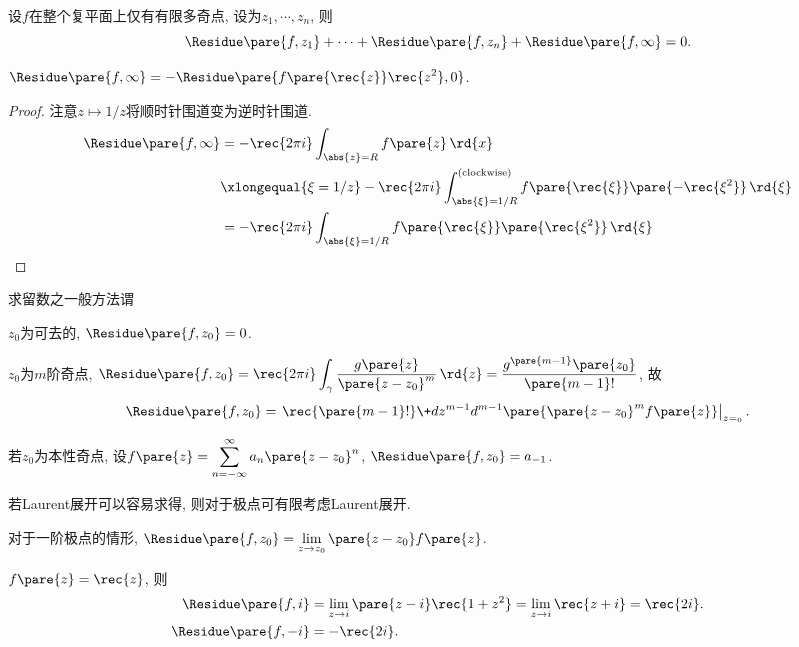 \documentclass[../ComplexVariable.tex]{subfiles}
\begin{document}
\begin{theorem}
    设$f$在整个复平面上仅有有限多奇点, 设为$z_1, \cdots, z_n$, 则
    \[ \Residue\pare{f,z_1} + \cdots + \Residue\pare{f,z_n} + \Residue\pare{f,\infty} = 0. \]
\end{theorem}
\begin{theorem}
    $\displaystyle \Residue\pare{f,\infty} = -\Residue\pare{f\pare{\rec{z}}\rec{z^2}, 0}$.
\end{theorem}
\begin{proof}
    注意$z\mapsto 1/z$将顺时针围道变为逆时针围道.
    \begin{align*}
        \Residue\pare{f,\infty} &= -\rec{2\pi i} \int_{\abs{z}=R}f\pare{z}\,\rd{x} \\ &\xlongequal{\xi = 1/z} -\rec{2\pi i} \int^{\mathrm{(clockwise)}}_{\abs{\xi} = 1/R} f\pare{\rec{\xi}} \pare{-\rec{\xi^2}}\,\rd{\xi} \\
        &= -\rec{2\pi i} \int_{\abs{\xi} = 1/R} f\pare{\rec{\xi}} \pare{\rec{\xi^2}}\,\rd{\xi} \qedhere
    \end{align*}
\end{proof}
求留数之一般方法谓
\begin{cenum}
    \item $z_0$为可去的, $\Residue\pare{f,z_0} = 0$.
    \item $z_0$为$m$阶奇点, $\Residue\pare{f,z_0} = \displaystyle \rec{2\pi i}\int_\gamma \frac{g\pare{z}}{\pare{z-z_0}^m}\,\rd{z} = \frac{g^{\pare{m-1}}\pare{z_0}}{\pare{m-1}!}$, 故
    \[ \Residue\pare{f,z_0} = \left.\rec{\pare{m-1}!} \+d{z^{m-1}}d{^{m-1}} \pare{\pare{z-z_0}^mf\pare{z}}\right\vert_{z=_0}. \]
    \item 若$z_0$为本性奇点, 设$\displaystyle f\pare{z} = \sum_{n=-\infty}^\infty a_n\pare{z-z_0}^n$, $\Residue\pare{f,z_0} = a_{-1}$.
\end{cenum}
\begin{remark}
    若Laurent展开可以容易求得, 则对于极点可有限考虑Laurent展开.
\end{remark}
\begin{remark}
    对于一阶极点的情形, $\Residue\pare{f,z_0} = \displaystyle \lim_{z\rightarrow z_0} \pare{z-z_0}f\pare{z}$.
\end{remark}
\begin{sample}
    \begin{ex}
        $f\pare{z} = \displaystyle \rec{z}$, 则
        \begin{align*}
            \Residue\pare{f,i} &= \lim_{z\rightarrow i} \pare{z-i}\rec{1+z^2} = \lim_{z\rightarrow i}\rec{z+i} = \rec{2i}. \\
            \Residue\pare{f,-i} &= -\rec{2i}.
        \end{align*}
    \end{ex}
\end{sample}
\end{document}
